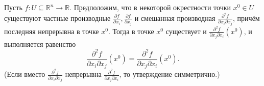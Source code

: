 


\begin{theorem}
Пусть \(f: U \subseteq \mathbb{R}^n \to \mathbb{R}\). Предположим, что в некоторой окрестности точки \(x^0 \in U\) существуют частные производные \(\frac{\partial f}{\partial x_i}, \frac{\partial f}{\partial x_j}\) и смешанная производная \(\frac{\partial^2 f}{\partial x_i \partial x_j}\), причём последняя непрерывна в точке \(x^0\). Тогда в точке \(x^0\) существует и \(\frac{\partial^2 f}{\partial x_j \partial x_i}(x^0)\), и выполняется равенство
\[
\frac{\partial^2 f}{\partial x_i \partial x_j}(x^0) = \frac{\partial^2 f}{\partial x_j \partial x_i}(x^0).
\]
(Если вместо \(\frac{\partial^2 f}{\partial x_i \partial x_j}\) непрерывна \(\frac{\partial^2 f}{\partial x_j \partial x_i}\), то утверждение симметрично.)
\end{theorem}

